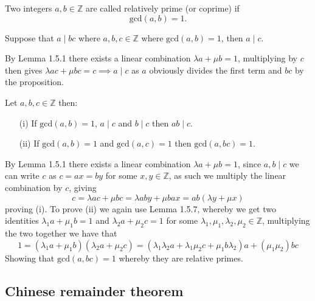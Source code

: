 \begin{defi}
    Two integers $a,b\in\mathbb{Z}$ are called relatively prime (or coprime) if
    \[
        \text{gcd}(a,b)=1
    .\]\vskip -10pt
\end{defi}
\begin{coro}
    Suppose that $a\mid bc$ where $a,b,c\in\mathbb{Z}$ where $\text{gcd}(a,b)=1$, then $a\mid c$.
\end{coro}
\begin{prf}
    By Lemma 1.5.1 there exists a linear combination $\lambda a+\mu b=1$, multiplying by $c$ then gives $\lambda ac+\mu bc=c\implies a\mid c$ as $a$ obviously divides the first term and $bc$ by the proposition.
\end{prf}\vskip -10pt
\begin{coro}
    Let $a,b,c\in\mathbb{Z}$ then:
    \begin{itemize}
        \item[(i)] If $\text{gcd}(a,b)=1$, $a\mid c$ and $b\mid c$ then $ab\mid c$.
        \item[(ii)] If $\text{gcd}(a,b)=1$ and $\text{gcd}(a,c)=1$ then $\text{gcd}(a,bc)=1$.
    \end{itemize}
\end{coro}
\begin{prf}
    By Lemma 1.5.1 there exists a linear combination $\lambda a+\mu b=1$, since $a,b\mid c$ we can write $c$ as $c=ax=by$ for some $x,y\in\mathbb{Z}$, as such we multiply the linear combination by $c$, giving
    \[
        c=\lambda ac+\mu bc=\lambda aby+\mu bax=ab(\lambda y+\mu x)
    \]
    proving (i). To prove (ii) we again use Lemma 1.5.7, whereby we get two identities $\lambda_{1}a+\mu_{1}b=1$ and $\lambda_{2}a+\mu_{2}c=1$ for some $\lambda_{1},\mu_{1},\lambda_{2},\mu_{2}\in\mathbb{Z}$,  multiplying the two together we have that
    \[
        1=(\lambda_{1}a+\mu_{1}b)(\lambda_{2}a+\mu_{2}c)=(\lambda_{1}\lambda_{2}a+\lambda_{1}\mu_{2}c+\mu_{1}b\lambda_{2})a+(\mu_{1}\mu_{2})bc
    \]
    Showing that $\text{gcd}(a,bc)=1$ whereby they are relative primes.
\end{prf}
\pagebreak\subsection{Chinese remainder theorem}
